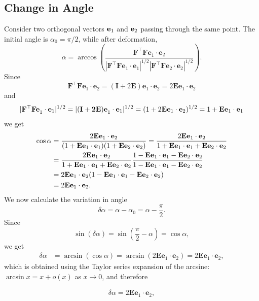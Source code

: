 \subsection{Change in Angle}
Consider two orthogonal vectors $\mathbf{e}_{1}$ and $\mathbf{e}_2$ passing through the same point. The initial angle is $\alpha_0=\pi/2$, while after deformation,
\begin{equation}
	\alpha=\arccos\left(\frac{\mathbf{F^{\top}Fe}_1\cdot\mathbf{e}_2}{|\mathbf{F^{\top}Fe}_1\cdot\mathbf{e}_1|^{1/2}|\mathbf{F^{\top}Fe}_2\cdot\mathbf{e}_2|^{1/2}}\right).
\end{equation}
Since
\begin{equation}
	\mathbf{F^{\top}Fe}_1\cdot\mathbf{e}_2=(\mathbf{I}+2\mathbf{E})\mathbf{e}_1\cdot\mathbf{e}_2=2\mathbf{Ee}_1\cdot\mathbf{e}_2
\end{equation}
and 
\begin{equation}
	\mathbf{|F^{\top}Fe}_1\cdot \mathbf{e}_1|^{1/2}=\mathbf{|(I+2E)e}_1\cdot \mathbf{e}_1|^{1/2}=(1+2\mathbf{E}\mathbf{e}_1\cdot \mathbf{e}_2)^{1/2}=1+\mathbf{E}\mathbf{e}_1\cdot \mathbf{e}_1
\end{equation}
we get
\begin{equation}
	\begin{aligned}
		\cos\alpha & =\frac{2\mathbf{Ee}_1\cdot\mathbf{e}_2}{(1+\mathbf{Ee}_1\cdot\mathbf{e}_1)(1+\mathbf{Ee}_2\cdot\mathbf{e}_2)}=\frac{2\mathbf{Ee}_1\cdot\mathbf{e}_2}{1+\mathbf{Ee}_1\cdot\mathbf{e}_1+\mathbf{Ee}_2\cdot\mathbf{e}_2}  \\
		&=\frac{2\mathbf{Ee}_1\cdot\mathbf{e}_2}{1+\mathbf{Ee}_1\cdot\mathbf{e}_1+\mathbf{Ee}_2\cdot\mathbf{e}_2}\frac{1-\mathbf{Ee}_1\cdot\mathbf{e}_1-\mathbf{Ee}_2\cdot\mathbf{e}_2}{1-\mathbf{Ee}_1\cdot\mathbf{e}_1-\mathbf{Ee}_2\cdot\mathbf{e}_2} \\
		&=2\mathbf{Ee}_1\cdot\mathbf{e}_2(1-\mathbf{Ee}_1\cdot\mathbf{e}_1-\mathbf{Ee}_2\cdot\mathbf{e}_2) \\
		&=2\mathbf{Ee}_1\cdot\mathbf{e}_2.
	\end{aligned}
\end{equation}
We now calculate the variation in angle
\begin{equation}
	\delta\alpha=\alpha-\alpha_0=\alpha-\frac{\pi}{2}.
\end{equation}
Since
\begin{equation}
	\sin(\delta\alpha)=\sin(\frac\pi2-\alpha)=\cos\alpha,
\end{equation}
we get
\begin{equation}
	\begin{aligned}\delta\alpha&=\arcsin(\cos\alpha)=\arcsin(2\mathbf{Ee}_1\cdot\mathbf{e}_2)=2\mathbf{Ee}_1\cdot\mathbf{e}_2,\end{aligned}
\end{equation}
which is obtained using the Taylor series expansion of the arcsine: $\arcsin x=x+o(x)$ as $x\to 0$, and therefore
\begin{definition}
	\begin{equation}\label{E12}
		\begin{aligned}\delta\alpha=2\mathbf{Ee}_1\cdot\mathbf{e}_2,\end{aligned}
	\end{equation}
\end{definition}

